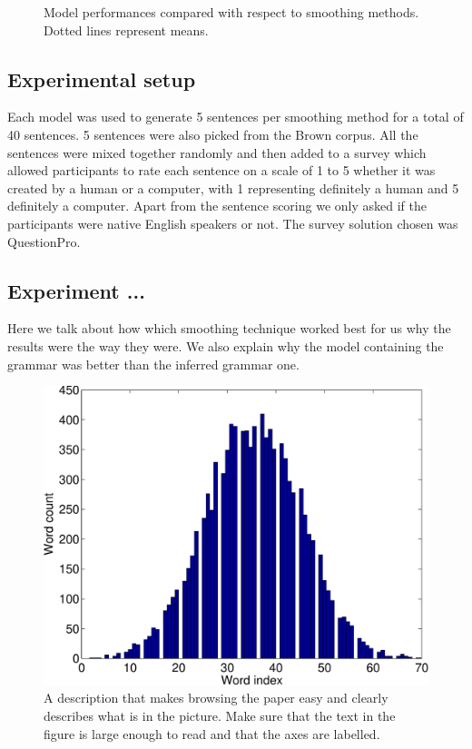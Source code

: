 \documentclass[a4paper,12pt]{article}
\begin{document}
\begin{figure}[t!]
    \caption{Model performances compared with respect to smoothing methods. Dotted lines represent means.}%
    \label{fig:example}%
\end{figure}

\subsection{Experimental setup}
Each model was used to generate 5 sentences per smoothing method for a total of 40 sentences. 5 sentences were also picked from the Brown corpus. All the sentences were mixed together randomly and then added to a survey which allowed participants to rate each sentence on a scale of 1 to 5 whether it was created by a human or a computer, with 1 representing definitely a human and 5 definitely a computer. Apart from the sentence scoring we only asked if the participants were native English speakers or not. The survey solution chosen was QuestionPro.

\subsection{Experiment ...}

Here we talk about how which smoothing technique worked best for us why the results were the way they were. We also explain why the model containing the grammar was better than the inferred grammar one.

\begin{figure}
\centering
\includegraphics[width=0.8\linewidth]{histogram}
\caption{A description that makes browsing the paper easy and clearly
describes what is in the picture. Make sure that the text in the figure
is large enough to read and that the axes are labelled.}
\label{fig:histogram}
\end{figure}
\end{document}

